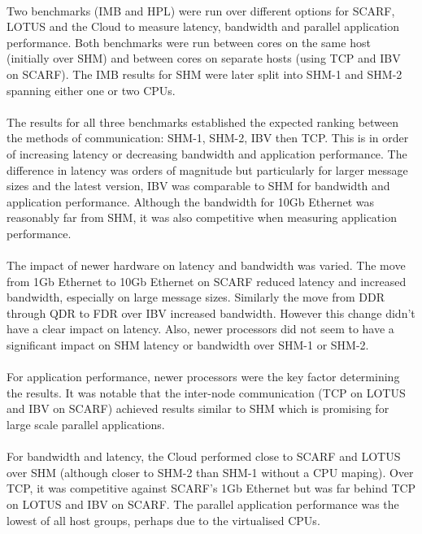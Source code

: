 \documentclass{article}
\begin{document}
    \paragraph{}
    Two benchmarks (IMB and HPL) were run over different options for SCARF, LOTUS and the Cloud to measure latency, bandwidth and parallel application performance. Both benchmarks were run between cores on the same host (initially over SHM) and between cores on separate hosts (using TCP and IBV on SCARF). The IMB results for SHM were later split into SHM-1 and SHM-2 spanning either one or two CPUs.

    \paragraph{}
    The results for all three benchmarks established the expected ranking between the methods of communication: SHM-1, SHM-2, IBV then TCP. This is in order of increasing latency or decreasing bandwidth and application performance. The difference in latency was orders of magnitude but particularly for larger message sizes and the latest version, IBV was comparable to SHM for bandwidth and application performance. Although the bandwidth for 10Gb Ethernet was reasonably far from SHM, it was also competitive when measuring application performance.

    \paragraph{}
    The impact of newer hardware on latency and bandwidth was varied. The move from 1Gb Ethernet to 10Gb Ethernet on SCARF reduced latency and increased bandwidth, especially on large message sizes. Similarly the move from DDR through QDR to FDR over IBV increased bandwidth. However this change didn't have a clear impact on latency. Also, newer processors did not seem to have a significant impact on SHM latency or bandwidth over SHM-1 or SHM-2.

    \paragraph{}
    For application performance, newer processors were the key factor determining the results. It was notable that the inter-node communication (TCP on LOTUS and IBV on SCARF) achieved results similar to SHM which is promising for large scale parallel applications.

    \paragraph{}
    For bandwidth and latency, the Cloud performed close to SCARF and LOTUS over SHM (although closer to SHM-2 than SHM-1 without a CPU maping). Over TCP, it was competitive against SCARF's 1Gb Ethernet but was far behind TCP on LOTUS and IBV on SCARF. The parallel application performance was the lowest of all host groups, perhaps due to the virtualised CPUs.
\end{document}
